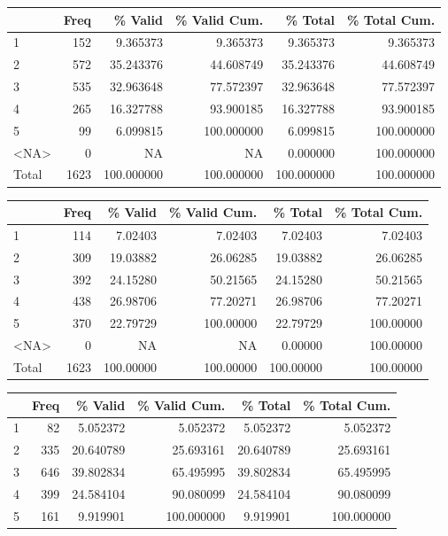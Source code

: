 \documentclass[
  letterpaper,
  DIV=11,
  numbers=noendperiod]{scrartcl}
\begin{document}
\begin{table}
\centering
\begin{tabular}[t]{l|r|r|r|r|r}
\hline
  & Freq & \% Valid & \% Valid Cum. & \% Total & \% Total Cum.\\
\hline
1 & 152 & 9.365373 & 9.365373 & 9.365373 & 9.365373\\
\hline
2 & 572 & 35.243376 & 44.608749 & 35.243376 & 44.608749\\
\hline
3 & 535 & 32.963648 & 77.572397 & 32.963648 & 77.572397\\
\hline
4 & 265 & 16.327788 & 93.900185 & 16.327788 & 93.900185\\
\hline
5 & 99 & 6.099815 & 100.000000 & 6.099815 & 100.000000\\
\hline
<NA> & 0 & NA & NA & 0.000000 & 100.000000\\
\hline
Total & 1623 & 100.000000 & 100.000000 & 100.000000 & 100.000000\\
\hline
\end{tabular}
\centering
\begin{tabular}[t]{l|r|r|r|r|r}
\hline
  & Freq & \% Valid & \% Valid Cum. & \% Total & \% Total Cum.\\
\hline
1 & 114 & 7.02403 & 7.02403 & 7.02403 & 7.02403\\
\hline
2 & 309 & 19.03882 & 26.06285 & 19.03882 & 26.06285\\
\hline
3 & 392 & 24.15280 & 50.21565 & 24.15280 & 50.21565\\
\hline
4 & 438 & 26.98706 & 77.20271 & 26.98706 & 77.20271\\
\hline
5 & 370 & 22.79729 & 100.00000 & 22.79729 & 100.00000\\
\hline
<NA> & 0 & NA & NA & 0.00000 & 100.00000\\
\hline
Total & 1623 & 100.00000 & 100.00000 & 100.00000 & 100.00000\\
\hline
\end{tabular}
\centering
\begin{tabular}[t]{l|r|r|r|r|r}
\hline
  & Freq & \% Valid & \% Valid Cum. & \% Total & \% Total Cum.\\
\hline
1 & 82 & 5.052372 & 5.052372 & 5.052372 & 5.052372\\
\hline
2 & 335 & 20.640789 & 25.693161 & 20.640789 & 25.693161\\
\hline
3 & 646 & 39.802834 & 65.495995 & 39.802834 & 65.495995\\
\hline
4 & 399 & 24.584104 & 90.080099 & 24.584104 & 90.080099\\
\hline
5 & 161 & 9.919901 & 100.000000 & 9.919901 & 100.000000\\

\end{tabular}
\end{table}
\end{document}
